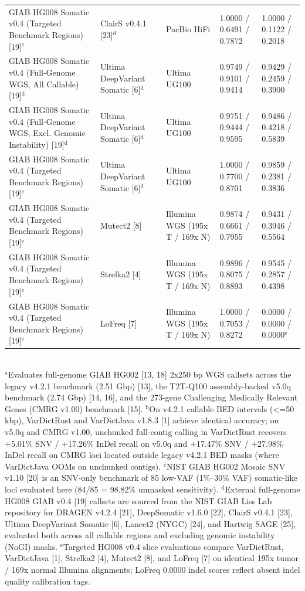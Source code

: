 \begin{table}[htbp]
{\begin{tabular}{lllll}
GIAB HG008 Somatic v0.4 (Targeted Benchmark Regions) [19]$^{\text{e}}$ & ClairS v0.4.1 [23]$^{\text{d}}$ & PacBio HiFi & 1.0000 / 0.6491 / 0.7872 & 1.0000 / 0.1122 / 0.2018 \\
GIAB HG008 Somatic v0.4 (Full-Genome WGS, All Callable) [19]$^{\text{d}}$ & Ultima DeepVariant Somatic [6]$^{\text{d}}$ & Ultima UG100 & 0.9749 / 0.9101 / 0.9414 & 0.9429 / 0.2459 / 0.3900 \\
GIAB HG008 Somatic v0.4 (Full-Genome WGS, Excl. Genomic Instability) [19]$^{\text{d}}$ & Ultima DeepVariant Somatic [6]$^{\text{d}}$ & Ultima UG100 & 0.9751 / 0.9444 / 0.9595 & 0.9486 / 0.4218 / 0.5839 \\
GIAB HG008 Somatic v0.4 (Targeted Benchmark Regions) [19]$^{\text{e}}$ & Ultima DeepVariant Somatic [6]$^{\text{d}}$ & Ultima UG100 & 1.0000 / 0.7700 / 0.8701 & 0.9859 / 0.2381 / 0.3836 \\
GIAB HG008 Somatic v0.4 (Targeted Benchmark Regions) [19]$^{\text{e}}$ & Mutect2 [8] & Illumina WGS (195x T / 169x N) & 0.9874 / 0.6661 / 0.7955 & 0.9431 / 0.3946 / 0.5564 \\
GIAB HG008 Somatic v0.4 (Targeted Benchmark Regions) [19]$^{\text{e}}$ & Strelka2 [4] & Illumina WGS (195x T / 169x N) & 0.9896 / 0.8075 / 0.8893 & 0.9545 / 0.2857 / 0.4398 \\
GIAB HG008 Somatic v0.4 (Targeted Benchmark Regions) [19]$^{\text{e}}$ & LoFreq [7] & Illumina WGS (195x T / 169x N) & 1.0000 / 0.7053 / 0.8272 & 0.0000 / 0.0000 / 0.0000$^{\text{e}}$ \\
\hline
\end{tabular}%
}
\\[4pt]\footnotesize{$^{\text{a}}$Evaluates full-genome GIAB HG002 [13, 18] 2x250 bp WGS callsets across the legacy v4.2.1 benchmark (2.51 Gbp) [13], the T2T-Q100 assembly-backed v5.0q benchmark (2.74 Gbp) [14, 16], and the 273-gene Challenging Medically Relevant Genes (CMRG v1.00) benchmark [15]. $^{\text{b}}$On v4.2.1 callable BED intervals (\textless{}=50 kbp), VarDictRust and VarDictJava v1.8.3 [1] achieve identical accuracy; on v5.0q and CMRG v1.00, unchunked full-contig calling in VarDictRust recovers +5.01\% SNV / +17.26\% InDel recall on v5.0q and +17.47\% SNV / +27.98\% InDel recall on CMRG loci located outside legacy v4.2.1 BED masks (where VarDictJava OOMs on unchunked contigs). $^{\text{c}}$NIST GIAB HG002 Mosaic SNV v1.10 [20] is an SNV-only benchmark of 85 low-VAF (1\%--30\% VAF) somatic-like loci evaluated here (84/85 = 98.82\% unmasked sensitivity). $^{\text{d}}$External full-genome HG008 GIAB v0.4 [19] callsets are sourced from the NIST GIAB Liss Lab repository for DRAGEN v4.2.4 [21], DeepSomatic v1.6.0 [22], ClairS v0.4.1 [23], Ultima DeepVariant Somatic [6], Lancet2 (NYGC) [24], and Hartwig SAGE [25], evaluated both across all callable regions and excluding genomic instability (NoGI) masks. $^{\text{e}}$Targeted HG008 v0.4 slice evaluations compare VarDictRust, VarDictJava [1], Strelka2 [4], Mutect2 [8], and LoFreq [7] on identical 195x tumor / 169x normal Illumina alignments; LoFreq 0.0000 indel scores reflect absent indel quality calibration tags.}
\end{table}
